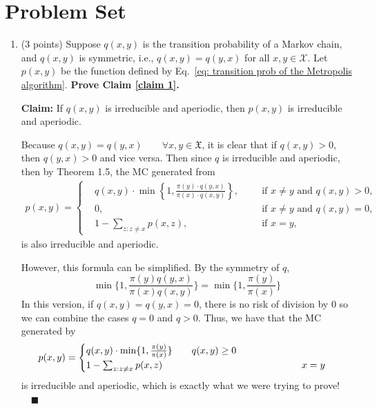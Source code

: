 \documentclass[11pt,letterpaper, leqno]{article}
\numberwithin{equation}{section}
\numberwithin{theorem}{section}
\numberwithin{lemma}{section}
\numberwithin{corollary}{section}
\numberwithin{definition}{section}
\numberwithin{proposition}{section}
\numberwithin{remark}{section}
\numberwithin{example}{section}
\renewcommand{\qed}{\quad \blacksquare}
\newcommand{\mfX}{\mathfrak{X}}
\begin{document}
\newpage

\section{Problem Set}

\begin{enumerate}

\item (3 points) Suppose $q(x,y)$ is the transition probability of a Markov chain, and $q(x,y)$ is symmetric, i.e., $q(x,y)=q(y,x)$ for all $x,y\in\mathcal{X}$. Let $p(x,y)$ be the function defined by Eq.~\eqref{eq: transition prob of the Metropolis algorithm}. \textbf{Prove Claim \ref{claim 1}.}

    \color{blue}
        \textbf{Claim:} If $q(x, y)$ is irreducible and aperiodic, then $p(x, y)$ is irreducible and aperiodic. 

        Because $q(x, y) = q(y, x) \qquad \forall x, y \in \mfX$, it is clear that if $q(x, y) > 0$, then $q(y, x) > 0$ and vice versa. Then since $q$ is irreducible and aperiodic, then by Theorem 1.5, the MC generated from 
        \begin{align*}
            p(x,y)=\left\{
                \begin{aligned}
                & q(x,y)\cdot\min\left\{1, \frac{\pi(y)\cdot q(y,x)}{\pi(x)\cdot q(x,y)}\right\},\ \ &&\mbox{ if }x\ne y \mbox{ and }q(x,y)>0, \\
                & 0, \ \ &&\mbox{ if }x\ne y \mbox{ and }q(x,y)=0, \\
                & 1-\sum_{z:z\ne x} p(x,z), \ \ &&\mbox{ if }x=y,
                \end{aligned}
                \right.
        \end{align*}
        is also irreducible and aperiodic. 

        However, this formula can be simplified. By the symmetry of $q$, 
        \[\min\{1, \frac{\pi(y)q(y, x)}{\pi(x)q(x, y)}\} = \min\{1, \frac{\pi(y)}{\pi(x)}\}\]
        In this version, if $q(x, y) = q(y,x) = 0$, there is no risk of division by $0$ so we can combine the cases $q =0$ and $q > 0$. Thus, we have that the MC generated by 
        \[p(x, y) = \begin{cases}
            q(x, y)\cdot \min \{1, \frac{\pi(y)}{\pi(x)}\}\qquad q(x, y) \geq 0\\
            1 - \sum_{z:z\neq x} p(x, z) \hspace*{2in} x = y
        \end{cases}\]
        is irreducible and aperiodic, which is exactly what we were trying to prove! $\qed$
    \color{black}


\end{enumerate}
\end{document}

